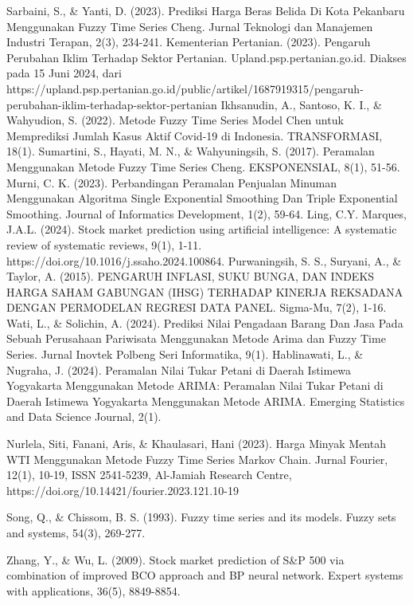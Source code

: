 \documentclass[conference]{IEEEtran}
\begin{document}
\begin{thebibliography}{00}
 Sarbaini, S., \& Yanti, D. (2023). Prediksi Harga Beras Belida Di Kota Pekanbaru Menggunakan Fuzzy Time Series Cheng. Jurnal Teknologi dan Manajemen Industri Terapan, 2(3), 234-241.
Kementerian Pertanian. (2023). Pengaruh Perubahan Iklim Terhadap Sektor Pertanian. Upland.psp.pertanian.go.id. Diakses pada 15 Juni 2024, dari https://upland.psp.pertanian.go.id/public/artikel/1687919315/pengaruh-perubahan-iklim-terhadap-sektor-pertanian
 Ikhsanudin, A., Santoso, K. I., \& Wahyudion, S. (2022). Metode Fuzzy Time Series Model Chen untuk Memprediksi Jumlah Kasus Aktif Covid-19 di Indonesia. TRANSFORMASI, 18(1).
 Sumartini, S., Hayati, M. N., \& Wahyuningsih, S. (2017). Peramalan Menggunakan Metode Fuzzy Time Series Cheng. EKSPONENSIAL, 8(1), 51-56.
 Murni, C. K. (2023). Perbandingan Peramalan Penjualan Minuman Menggunakan Algoritma Single Exponential Smoothing Dan Triple Exponential Smoothing. Journal of Informatics Development, 1(2), 59-64.
 Ling, C.Y. Marques, J.A.L. (2024). Stock market prediction using artificial intelligence: A systematic review of systematic reviews, 9(1), 1-11. https://doi.org/10.1016/j.ssaho.2024.100864.
 Purwaningsih, S. S., Suryani, A., \& Taylor, A. (2015). PENGARUH INFLASI, SUKU BUNGA, DAN INDEKS HARGA SAHAM GABUNGAN (IHSG) TERHADAP KINERJA REKSADANA DENGAN PERMODELAN REGRESI DATA PANEL. Sigma-Mu, 7(2), 1-16.
 Wati, L., \& Solichin, A. (2024). Prediksi Nilai Pengadaan Barang Dan Jasa Pada Sebuah Perusahaan Pariwisata Menggunakan Metode Arima dan Fuzzy Time Series. Jurnal Inovtek Polbeng Seri Informatika, 9(1).
 Hablinawati, L., \& Nugraha, J. (2024). Peramalan Nilai Tukar Petani di Daerah Istimewa Yogyakarta Menggunakan Metode ARIMA: Peramalan Nilai Tukar Petani di Daerah Istimewa Yogyakarta Menggunakan Metode ARIMA. Emerging Statistics and Data Science Journal, 2(1).

 Nurlela, Siti, Fanani, Aris, \& Khaulasari, Hani (2023). Harga Minyak Mentah WTI Menggunakan Metode Fuzzy Time Series Markov Chain. Jurnal Fourier, 12(1), 10-19, ISSN 2541-5239, Al-Jamiah Research Centre, https://doi.org/10.14421/fourier.2023.121.10-19

 Song, Q., \& Chissom, B. S. (1993). Fuzzy time series and its models. Fuzzy sets and systems, 54(3), 269-277.

 Zhang, Y., \& Wu, L. (2009). Stock market prediction of S\&P 500 via combination of improved BCO approach and BP neural network. Expert systems with applications, 36(5), 8849-8854.


\end{thebibliography}
\end{document}
